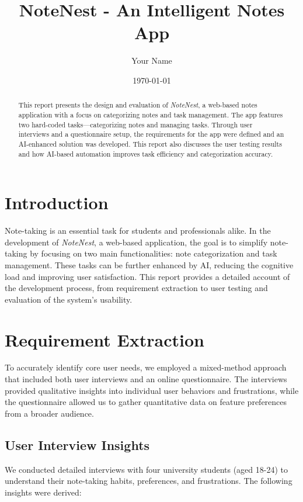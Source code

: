 \documentclass[a4paper, 12pt]{article}
\title{NoteNest - An Intelligent Notes App}
\author{Your Name}
\date{\today}
\begin{document}
\maketitle

\begin{abstract}
This report presents the design and evaluation of \textit{NoteNest}, a web-based notes application with a focus on categorizing notes and task management. The app features two hard-coded tasks—categorizing notes and managing tasks. Through user interviews and a questionnaire setup, the requirements for the app were defined and an AI-enhanced solution was developed. This report also discusses the user testing results and how AI-based automation improves task efficiency and categorization accuracy.
\end{abstract}

\tableofcontents

\newpage

\section{Introduction}
Note-taking is an essential task for students and professionals alike. In the development of \textit{NoteNest}, a web-based application, the goal is to simplify note-taking by focusing on two main functionalities: note categorization and task management. These tasks can be further enhanced by AI, reducing the cognitive load and improving user satisfaction. This report provides a detailed account of the development process, from requirement extraction to user testing and evaluation of the system’s usability.

\section{Requirement Extraction}

To accurately identify core user needs, we employed a mixed-method approach that included both user interviews and an online questionnaire. The interviews provided qualitative insights into individual user behaviors and frustrations, while the questionnaire allowed us to gather quantitative data on feature preferences from a broader audience.

\subsection{User Interview Insights}
We conducted detailed interviews with four university students (aged 18-24) to understand their note-taking habits, preferences, and frustrations. The following insights were derived:
\end{document}

